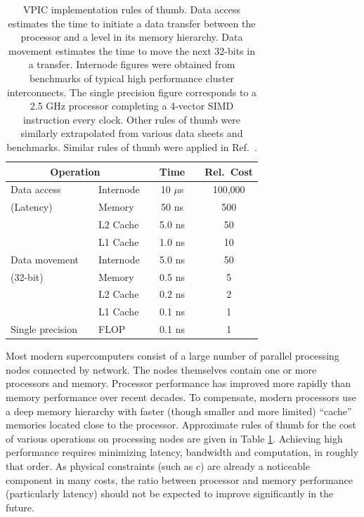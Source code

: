 \documentclass[aps,prl,preprint,preprintnumbers,groupedaddress]{revtex4}
\newcommand{\tbl}[1]{Table \ref{tbl:#1}}
\begin{document}
\begin{table}
\caption{\label{tbl:Rules_of_thumb}
VPIC implementation rules of thumb.  Data access estimates the time to
initiate a data transfer between the processor and a level in its
memory hierarchy.  Data movement estimates the time to move the next
32-bits in a transfer.  Internode figures were obtained from
benchmarks of typical high performance cluster interconnects.  The
single precision figure corresponds to a 2.5 GHz processor completing
a 4-vector SIMD instruction every clock.  Other rules of thumb were
similarly extrapolated from various data sheets and benchmarks.
Similar rules of thumb were applied in Ref.~\cite{Bowers_et_al_2006}.}
\begin{tabular}{l l l c c c c}
\hline
\hline
\multicolumn{3}{c}{Operation} & \hspace{18pt} & Time & \hspace{18pt} & Rel.~Cost \\
\hline
Data access      & \hspace{9pt} & Internode & & 10 $\mu$s & & 100,000 \\
(Latency)        & & Memory    & & 50 ns     & & 500     \\
                 & & L2 Cache  & & 5.0 ns    & & 50      \\
\vspace{4pt}     & & L1 Cache  & & 1.0 ns    & & 10      \\
Data movement    & & Internode & & 5.0 ns    & & 50      \\
(32-bit)         & & Memory    & & 0.5 ns    & & 5       \\
                 & & L2 Cache  & & 0.2 ns    & & 2       \\
\vspace{4pt}     & & L1 Cache  & & 0.1 ns    & & 1       \\
Single precision & & FLOP      & & 0.1 ns    & & 1       \\
\hline
\hline
\end{tabular}
\end{table}

Most modern supercomputers consist of a large number of parallel
processing nodes connected by network.  The nodes themselves contain
one or more processors and memory.  Processor performance has improved
more rapidly than memory performance over recent decades.  To
compensate, modern processors use a deep memory hierarchy with faster
(though smaller and more limited) ``cache'' memories located close to
the processor.  Approximate rules of thumb for the cost of various
operations on processing nodes are given in \tbl{Rules_of_thumb}.
Achieving high performance requires minimizing latency, bandwidth and
computation, in roughly that order.  As physical constraints (such as
$c$) are already a noticeable component in many costs, the ratio
between processor and memory performance (particularly latency) should
not be expected to improve significantly in the future.
\end{document}

